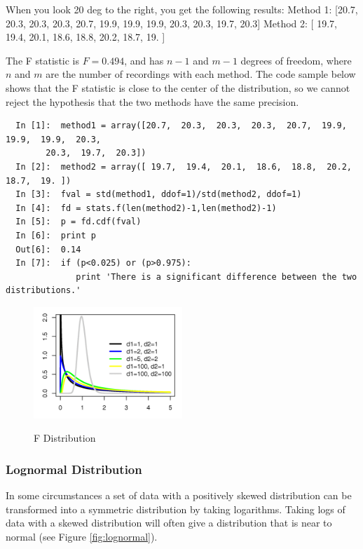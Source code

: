 When you look 20 deg to the right, you get the following results:
Method 1: [20.7,  20.3,  20.3,  20.3,  20.7,  19.9,  19.9,  19.9,  20.3,
        20.3,  19.7,  20.3]
Method 2: [ 19.7,  19.4,  20.1,  18.6,  18.8,  20.2,  18.7,  19. ]

The F statistic is $F = 0.494$, and has $n-1$ and $m-1$ degrees of freedom, where $n$ and $m$ are the number of recordings with each method. The code sample below shows that the F statistic is close to the center of the distribution, so we cannot reject the hypothesis that the two methods have the same precision.

\begin{lstlisting}
  In [1]:  method1 = array([20.7,  20.3,  20.3,  20.3,  20.7,  19.9,  19.9,  19.9,  20.3,
        20.3,  19.7,  20.3])
  In [2]:  method2 = array([ 19.7,  19.4,  20.1,  18.6,  18.8,  20.2,  18.7,  19. ])
  In [3]:  fval = std(method1, ddof=1)/std(method2, ddof=1)
  In [4]:  fd = stats.f(len(method2)-1,len(method2)-1)
  In [5]:  p = fd.cdf(fval)
  In [6]:  print p
  Out[6]:  0.14
  In [7]:  if (p<0.025) or (p>0.975):
              print 'There is a significant difference between the two distributions.'
\end{lstlisting}

\begin{figure}
  \centering
  \includegraphics[width=0.5\textwidth]{../Images/F_distributionPDF.png}\\
  \caption{F Distribution}
\end{figure}


\subsubsection{Lognormal Distribution}

In some circumstances a set of data with a positively skewed distribution can be transformed into a symmetric distribution by taking logarithms. Taking logs of data with a skewed distribution will often give a distribution that is near to normal (see Figure \ref{fig:lognormal}).

